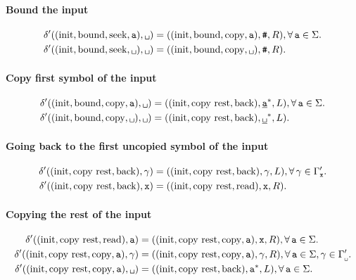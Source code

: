 \paragraph{Bound the input}
\begin{align}
  \delta'((\text{init},\text{bound}, \text{seek}, \s), \0{})
  &= ((\text{init},\text{bound},\text{copy}, \s), \e, R),
  \forall\,\s\in\Sigma.\\
  \delta'((\text{init},\text{bound}, \text{seek}, \0{}), \0{})
  &= ((\text{init},\text{bound},\text{copy}, \0{}), \e, R).
\end{align}

\paragraph{Copy first symbol of the input}
\begin{align}
  \delta'((\text{init},\text{bound},\text{copy}, \s), \0{})
  &= ((\text{init},\text{copy rest},\text{back}), \HA, L),
  \forall\,\s \in \Sigma.\\
  \delta'((\text{init},\text{bound},\text{copy}, \0{}), \0{})
  &= ((\text{init},\text{copy rest},\text{back}), \BB, L).
\end{align}

\paragraph{Going back to the first uncopied symbol of the input}
\begin{align}
  \delta'((\text{init},\text{copy rest},\text{back}), \gamma)
  &= ((\text{init},\text{copy rest},\text{back}), \gamma, L),
  \forall\,
  \gamma \in \Gamma'_{\texttt{x}{}}.\\
  \delta'((\text{init},\text{copy rest},\text{back}), \texttt{x})
  &= ((\text{init},\text{copy rest},\text{read}), \texttt{x}, R).
\end{align}

\paragraph{Copying the rest of the input}
\begin{align}
  \delta'((\text{init},\text{copy rest},\text{read}), \s)
  &= ((\text{init}, \text{copy rest}, \text{copy}, \s), \X, R),
  \forall\,
  \s \in\Sigma.\\
  \delta'((\text{init}, \text{copy rest},\text{copy}, \s), \gamma)
  &= ((\text{init}, \text{copy rest},\text{copy}, \s), \gamma, R),
  \forall\,
  \s \in\Sigma,
  \gamma \in\gpwb.\\
  \delta'((\text{init}, \text{copy rest},\text{copy}, \s), \0{})
  &= ((\text{init},\text{copy rest},\text{back}), \A, L),
  \forall\,
  \s \in\Sigma.
\end{align}

